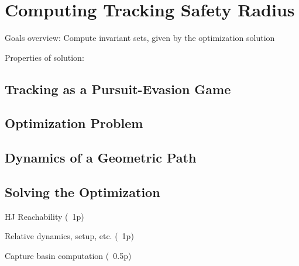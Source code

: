 \section{Computing Tracking Safety Radius \label{sec:reachability}}
Goals overview: Compute invariant sets, given by the optimization solution

Properties of solution: 

\subsection{Tracking as a Pursuit-Evasion Game}

\subsection{Optimization Problem}

\subsection{Dynamics of a Geometric Path}

\subsection{Solving the Optimization}

HJ Reachability (~1p)

Relative dynamics, setup, etc. (~1p)

Capture basin computation (~0.5p)